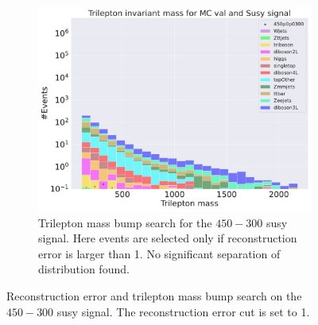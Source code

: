 \begin{figure}[h!]
\begin{subfigure}{.8\textwidth}
        \includegraphics[width=\textwidth]{Figures/AE_testing/small/b_data_recon_big_rm3_feats_sig_450p0p0300_Trilepton mass.pdf}
        \caption{Trilepton mass bump search for the $450-300$ susy signal. Here events are selected only if reconstruction error is larger than 1. No significant 
        separation of distribution found.}
        \label{fig:ae_susy_450_300_trilep}
    \end{subfigure}
    \hfill        
    \caption{Reconstruction error and trilepton mass bump search on the $450-300$ susy signal. The reconstruction error cut is set to 1. }
    \label{fig:ae_susy_450_300_recon_trilep}
\end{figure}


